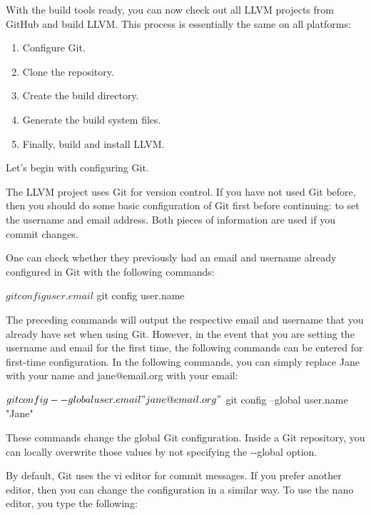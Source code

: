 
With the build tools ready, you can now check out all LLVM projects from GitHub and build LLVM. This process is essentially the same on all platforms:

\begin{enumerate}
\item 
Configure Git.

\item 
Clone the repository.

\item 
Create the build directory.

\item 
Generate the build system files.

\item 
Finally, build and install LLVM.
\end{enumerate}

Let’s begin with configuring Git.


The LLVM project uses Git for version control. If you have not used Git before, then you should do some basic configuration of Git first before continuing: to set the username and email address. Both pieces of information are used if you commit changes.

One can check whether they previously had an email and username already configured in Git with the following commands:

\begin{shell}
$ git config user.email
$ git config user.name
\end{shell}

The preceding commands will output the respective email and username that you already have set when using Git. However, in the event that you are setting the username and email for the first time, the following commands can be entered for first-time configuration. In the following commands, you can simply replace Jane with your name and jane@email.org with your email:

\begin{shell}
$ git config --global user.email "jane@email.org"
$ git config --global user.name "Jane"
\end{shell}

These commands change the global Git configuration. Inside a Git repository, you can locally overwrite those values by not specifying the -{}-global option.

By default, Git uses the vi editor for commit messages. If you prefer another editor, then you can change the configuration in a similar way. To use the nano editor, you type the following:

